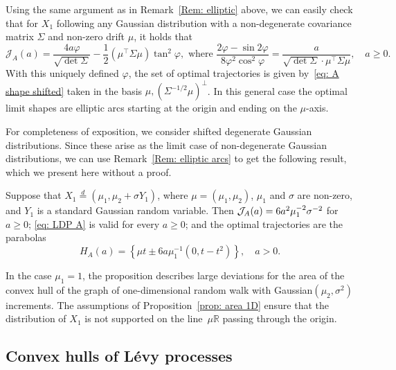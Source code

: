 \documentclass[AHL,Unicode,published]{cedram}
\newcommand{\Rbb}{\mathbb{R}}
\newcommand{\Jcl}{\mathcal{J}}
\begin{document}
\begin{rema}\label{Rem: elliptic arcs}
Using the same argument as in Remark~\ref{Rem: elliptic} above, we can easily check that for $X_1$ following any Gaussian distribution with a non-degenerate covariance matrix $\Sigma$ and non-zero drift $\mu$, it holds that
\[
\Jcl_A(a)=\frac{4a \varphi}{\sqrt{\det \Sigma}} - \frac12 \left(\mu^\top \Sigma \mu\right) \tan^2 \varphi, \text{ where } \frac{2\varphi - \sin 2 \varphi}{8 \varphi^2 \cos^2 \varphi} = \frac{a}{\sqrt{\det \Sigma} \cdot \mu^\top \Sigma \mu}, \quad a \ge 0.
\]
With this uniquely defined $\varphi$, the set of optimal trajectories is given by~\eqref{eq: A shape shifted} taken in the basis $\mu, (\Sigma^{-1/2} \mu)^\bot$. In this general case the optimal limit shapes are elliptic arcs starting at the origin and ending on the $\mu$-axis.
\end{rema}

For completeness of exposition, we consider shifted degenerate Gaussian distributions. Since these arise as the limit case of non-degenerate Gaussian distributions, we can use Remark~\ref{Rem: elliptic arcs} to get the following result, which we present here without a proof.

\begin{prop}\label{prop: area 1D}
Suppose that $X_1 \stackrel{d}{=}(\mu_1, \mu_2 + \sigma Y_1)$, where $\mu=(\mu_1, \mu_2)$, $\mu_1$ and $\sigma$ are non-zero, and $Y_1$ is a standard Gaussian random variable. Then $\Jcl_A(a)\linebreak= 6 a^2 \mu_1^{-2} \sigma^{-2}$ for $a \ge 0$; \eqref{eq: LDP A} is valid for every $a \ge 0$; and the optimal trajectories are the parabolas
\begin{equation*}
H_A(a)= \left\{\mu t \pm 6a \mu_1^{-1}\left(0, t- t^2\right) \right\}, \quad a > 0.
\end{equation*}
\end{prop}

In the case $\mu_1=1$, the proposition describes large deviations for the area of the convex hull of the graph of one-dimensional random walk with Gaussian$(\mu_2, \sigma^2)$ increments. The assumptions of Proposition~\ref{prop: area 1D} ensure that the distribution of $X_1$ is not supported on the line~$\mu \Rbb$ passing through the origin.



\subsection{Convex hulls of L\'evy processes} \label{sec: continuous time}
\end{document}
